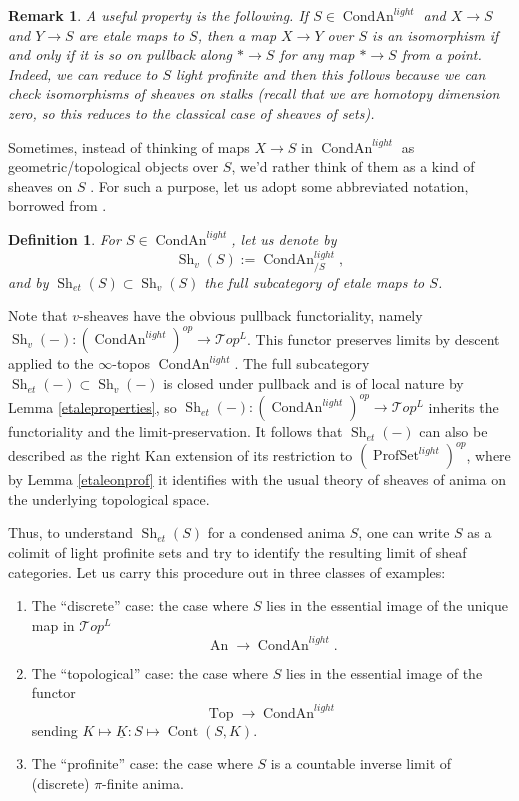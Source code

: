 \documentclass[12pt]{article}
\newtheorem{definition}[theorem]{Definition}
\newtheorem{remark}[theorem]{Remark}
\newcommand{\on}{\operatorname}
\newcommand{\ul}{\underline}
\begin{document}
\begin{remark}\label{checkonstalks}
A useful property is the following.  If $S\in\on{CondAn}^{light}$ and $X\to S$ and $Y\to S$ are etale maps to $S$, then a map $X\to Y$ over $S$ is an isomorphism if and only if it is so on pullback along $\ast \to S$ for any map $\ast \to S$ from a point.  Indeed, we can reduce to $S$ light profinite and then this follows because we can check isomorphisms of sheaves on stalks (recall that we are homotopy dimension zero, so this reduces to the classical case of sheaves of sets).
\end{remark}

Sometimes, instead of thinking of maps $X\rightarrow S$ in $\on{CondAn}^{light}$ as geometric/topological objects over $S$, we'd rather think of them as a kind of sheaves on $S$ . For such a purpose, let us adopt some abbreviated notation, borrowed from \cite{ScholzeDiamonds}.

\begin{definition}
For $S\in\on{CondAn}^{light}$, let us denote by
$$\on{Sh}_v(S):= \on{CondAn}^{light}_{/S},$$
and by $\on{Sh}_{et}(S)\subset\on{Sh}_v(S)$ the full subcategory of etale maps to $S$.
\end{definition}

Note that $v$-sheaves have the obvious pullback functoriality, namely $\on{Sh}_v(-):(\on{CondAn}^{light})^{op}\rightarrow \mathcal{T}op^L$.  This functor preserves limits by descent applied to the $\infty$-topos $\on{CondAn}^{light}$.  The full subcategory $\on{Sh}_{et}(-)\subset\on{Sh}_v(-)$ is closed under pullback and is of local nature by Lemma \ref{etaleproperties}, so $\on{Sh}_{et}(-):(\on{CondAn}^{light})^{op}\rightarrow \mathcal{T}op^L$ inherits the functoriality and the limit-preservation.  It follows that $\on{Sh}_{et}(-)$ can also be described as the right Kan extension of its restriction to $(\on{ProfSet}^{light})^{op}$, where by Lemma \ref{etaleonprof} it identifies with the usual theory of sheaves of anima on the underlying topological space.

Thus, to understand $\on{Sh}_{et}(S)$ for a condensed anima $S$, one can write $S$ as a colimit of light profinite sets and try to identify the resulting limit of sheaf categories.  Let us carry this procedure out in three classes of examples:
\begin{enumerate}
\item The ``discrete'' case: the case where $S$ lies in the essential image of the unique map in $\mathcal{T}op^L$
$$\on{An}\to\on{CondAn}^{light}.$$
\item The ``topological'' case: the case where $S$ lies in the essential image of the functor
$$\on{Top}\to \on{CondAn}^{light}$$
sending $K\mapsto \ul{K}: S\mapsto \on{Cont}(S,K).$
\item The ``profinite'' case: the case where $S$ is a countable inverse limit of (discrete) $\pi$-finite anima.
\end{enumerate}
\end{document}
